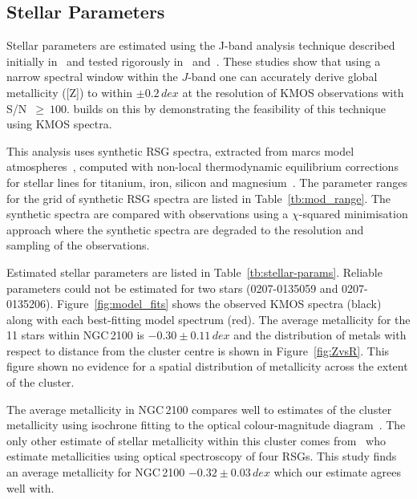 \documentclass[useAMS,usenatbib]{mn2e}
\begin{document}



\subsection{Stellar Parameters} %
\label{sub:stellar_parameters}

Stellar parameters are estimated using the J-band analysis technique described initially in~\cite{2010MNRAS.407.1203D}
and tested rigorously in~\cite{2014ApJ...788...58G} and~\cite{2015ApJ...806...21D}.
These studies show that using a narrow spectral window within the $J$-band one can accurately derive global metallicity ([Z]) to within
$\pm0.2\,dex$ at the resolution of KMOS observations with S/N~$\ge~100$.
\cite{2015ApJ...803...14P} builds on this by demonstrating the feasibility of this technique using KMOS spectra.

This analysis uses synthetic RSG spectra, extracted from {\sc marcs} model atmospheres~\citep{2008A&A...486..951G}, computed with non-local thermodynamic equilibrium corrections for stellar lines for titanium, iron, silicon and magnesium~\citep{2012ApJ...751..156B,2013ApJ...764..115B,2015ApJ...804..113B}.
The parameter ranges for the grid of synthetic RSG spectra are listed in Table~\ref{tb:mod_range}.
The synthetic spectra are compared with observations using a $\chi$-squared minimisation approach where the synthetic spectra are degraded to the resolution and sampling of the observations.

Estimated stellar parameters are listed in Table~\ref{tb:stellar-params}.
Reliable parameters could not be estimated for two stars (0207-0135059 and 0207-0135206).
Figure~\ref{fig:model_fits} shows the observed KMOS spectra (black) along with each best-fitting model spectrum (red).
The average metallicity for the 11 stars within NGC\,2100 is $-0.30\pm0.11\,dex$ and the distribution of metals with respect to distance from the cluster centre is shown in Figure~\ref{fig:ZvsR}.
This figure shown no evidence for a spatial distribution of metallicity across the extent of the cluster.


The average metallicity in NGC\,2100 compares well to estimates of the cluster metallicity using isochrone fitting to the optical colour-magnitude diagram~\citep[$-0.34\,dex$;][]{2015A&A...575A..62N}.
The only other estimate of stellar metallicity within this cluster comes from~\cite{1994A&A...282..717J}
who estimate metallicities using optical spectroscopy of four RSGs.
This study finds an average metallicity for NGC\,2100 $-0.32\pm0.03\,dex$ which our estimate agrees well with.
\end{document}
